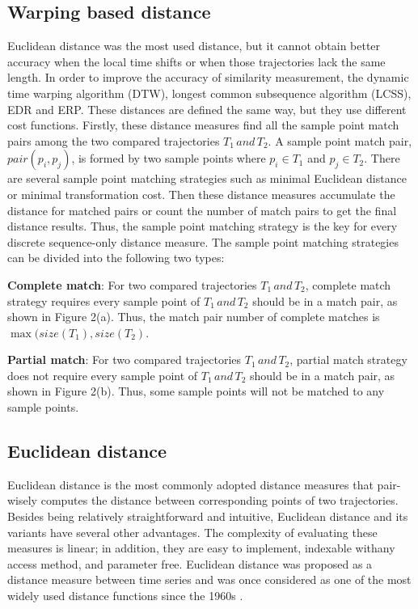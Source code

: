\documentclass[a4paper, 12pt]{article}
\begin{document}
\subsection{Warping based distance}
Euclidean distance was the most used distance, but it cannot obtain better accuracy when the local time shifts or when those trajectories lack the same length. In order to improve the accuracy of similarity measurement, the dynamic time warping algorithm (DTW), longest common subsequence algorithm (LCSS), EDR and ERP. These distances are defined the same way, but they use different cost functions. Firstly, these distance measures find all the sample point match pairs among the two compared trajectories $T_{1}\,and\,T_{2}$. A sample point match pair, $pair(p_{i},p_{j})$, is formed by two sample points where $p_{i} \in T_{1}$ and $p_{j} \in T_{2}$. There are several sample point matching strategies such as minimal Euclidean distance or minimal transformation cost. Then these distance measures accumulate the distance for matched pairs or count the number of match pairs to get the final distance results. Thus, the sample point matching strategy is the key for every discrete sequence-only distance measure. The sample point matching strategies can be divided into the following two types:

\textbf{Complete match}: For two compared trajectories $T_{1}\,and\,T_{2}$, complete match strategy requires every sample point of $T_{1}\,and\,T_{2}$ should be in a match pair, as shown in Figure 2(a). Thus, the match pair number of complete matches is $\max(size(T_{1}),size(T_{2})$.

\textbf{Partial match}: For two compared trajectories $T_{1}\,and\,T_{2}$, partial match strategy does not require every sample point of $T_{1}\,and\,T_{2}$ should be in a match pair, as shown in Figure 2(b). Thus, some sample points will not be matched to any sample points.

\subsection{Euclidean distance}
Euclidean distance is the most commonly adopted distance measures that pair-wisely computes the distance between corresponding points of two trajectories. Besides being relatively straightforward and intuitive, Euclidean distance and its variants have several other advantages. The complexity of evaluating these measures is linear; in addition, they are easy to implement, indexable withany access method, and parameter free. Euclidean distance was proposed as a distance measure between time series and was once considered as one of the most widely used distance functions since the 1960s \citep{keogh2000scaling,faloutsos1994fast,pfeifer1980three,priestley1980state}.
\end{document}
